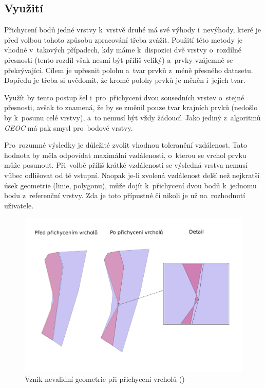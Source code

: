 \subsection{Využití}
\label{vs-vyuziti}

Přichycení bodů jedné vrstvy k~vrstvě druhé má své výhody i~nevýhody, které je před volbou tohoto způsobu zpracování třeba zvážit. Použití této metody je vhodné v~takových
případech, kdy máme k~dispozici dvě vrstvy o~rozdílné přesnosti (tento rozdíl však nesmí být příliš veliký) a~prvky vzájemně se překrývající.
Cílem je upřesnit polohu a~tvar prvků z~méně přesného datasetu. Dopředu je třeba si uvědomit, že kromě polohy prvků je měněn i~jejich tvar.

Využít by tento postup šel i~pro~přichycení dvou sousedních vrstev o~stejné přesnosti, avšak to znamená, že by se změnil pouze tvar krajních prvků (nedošlo by k~posunu 
celé vrstvy), a~to nemusí být vždy žádoucí. Jako jediný z~algoritmů \textit{GEOC} má pak smysl pro~bodové vrstvy.

Pro~rozumné výsledky je důležité zvolit vhodnou toleranční vzdálenost. Tato hodnota by měla odpovídat maximální vzdálenosti, o~kterou se vrchol prvku může posunout. Při~volbě
příliš krátké vzdálenosti se výsledná vrstva nemusí vůbec odlišovat od té vstupní. Naopak \mbox{je-li} zvolená vzdálenost delší než nejkratší úsek geometrie (linie, polygonu),
může dojít k~přichycení dvou bodů k~jednomu bodu z~referenční vrstvy. Zda je toto přípustné či nikoli je už na~rozhodnutí uživatele.

\label{vsinvalid}
  \begin{figure}[hbt]
    \centering
      \includegraphics[width=350pt]{./pictures/vs-invalid.pdf}
      \caption{Vznik nevalidní geometrie při přichycení vrcholů ()}
      \label{fig:vs-nevalidni}
  \end{figure} 

